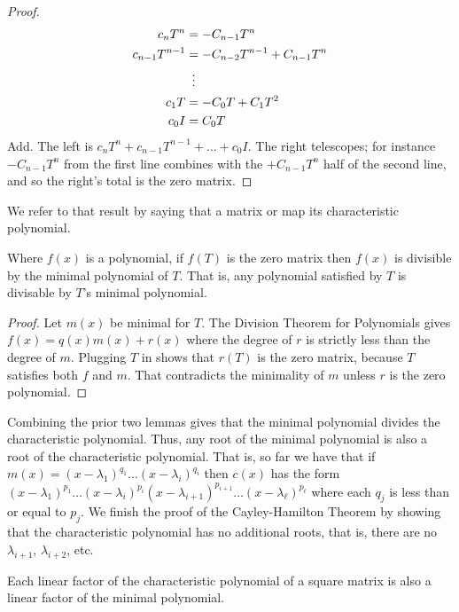 \begin{proof}
\begin{align*}
  c_nT^n
  &=-C_{n-1}T^n    \\
  c_{n-1}T^{n-1}
  &=-C_{n-2}T^{n-1}+C_{n-1}T^n    \\
  &\vdotswithin{=}             \\
  c_{1}T
  &=-C_{0}T+C_{1}T^2    \\
  c_{0}I
  &=C_{0}T
\end{align*}
Add.
The left is 
\( c_nT^n+c_{n-1}T^{n-1}+\dots+c_0I \). 
The right telescopes;
for instance $-C_{n-1}T^n$ from the first line combines with the 
$+C_{n-1}T^n$ half of the second line, and so 
the right's total is the zero matrix.
\end{proof}

We refer to that result by saying that a
matrix or map 
its characteristic polynomial.

\begin{lemma} \label{le:tSatisImpMinPolyDivides}
Where \( f(x) \) is a polynomial, if \( f(T) \) is the zero matrix 
then \( f(x) \) is divisible by the minimal polynomial of \( T \).
That is, any polynomial satisfied by \( T \) is divisable by
\( T \)'s minimal polynomial.
\end{lemma}

\begin{proof}
Let \( m(x) \) be minimal for \( T \).
The Division Theorem for Polynomials gives
\( f(x)=q(x)m(x)+r(x) \)
where the degree of \( r \) is strictly less than the degree of \( m \).
Plugging \( T \) in shows that \( r(T) \) is the zero matrix,
because $T$ satisfies both $f$ and $m$.
That contradicts the minimality of \( m \) unless \( r \)
is the zero polynomial.
\end{proof}

Combining the prior two lemmas gives that the minimal polynomial 
divides the characteristic polynomial. 
Thus,
any root of the minimal polynomial is also a root of the characteristic
polynomial. 
That is, so far we have that if 
\( m(x)=(x-\lambda_1)^{q_1}\dots(x-\lambda_i)^{q_i} \) then
\( c(x) \) has the form
\( (x-\lambda_1)^{p_1}\dots(x-\lambda_i)^{p_i}
     (x-\lambda_{i+1})^{p_{i+1}}\dots(x-\lambda_\ell)^{p_\ell} \) where
each \( q_j \) is less than or equal to \( p_j \).
We finish the proof of the Cayley-Hamilton Theorem by showing that 
the characteristic polynomial has no additional roots, that is,
there are no $\lambda_{i+1}$, $\lambda_{i+2}$, etc.

\begin{lemma}
Each linear factor of the characteristic polynomial of a square matrix
is also a linear factor of the minimal polynomial.
\end{lemma}

